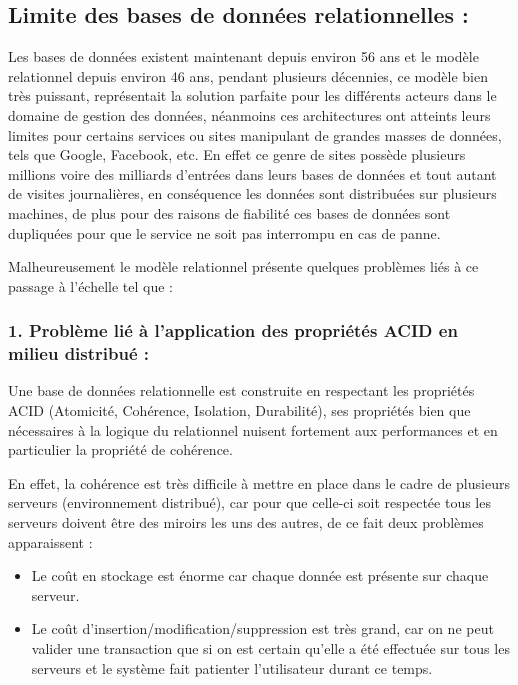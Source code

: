 \subsection{Limite des bases de données relationnelles :}
Les bases de données existent maintenant depuis environ 56 ans et le modèle relationnel depuis environ 46 ans, pendant plusieurs décennies, ce modèle bien très puissant, représentait la solution parfaite pour les différents acteurs dans le domaine de gestion des données, néanmoins ces architectures ont atteints leurs limites pour certains services ou sites manipulant de grandes masses de données, tels que Google, Facebook, etc. En effet ce genre de sites possède plusieurs millions voire des milliards d’entrées dans leurs bases de données et tout autant de visites journalières, en conséquence les données sont distribuées sur plusieurs machines, de plus pour des raisons de fiabilité ces bases de données sont dupliquées pour que le service ne soit pas interrompu en cas de panne.

Malheureusement le modèle relationnel présente quelques problèmes liés à ce passage à l’échelle tel que :

\subsubsection{1. Problème lié à l’application des propriétés ACID en milieu distribué :}
Une base de données relationnelle est construite en respectant les propriétés ACID (Atomicité, Cohérence, Isolation, Durabilité), ses propriétés bien que nécessaires à la logique du relationnel nuisent fortement aux performances et en particulier la propriété de cohérence.

En effet, la cohérence est très difficile à mettre en place dans le cadre de plusieurs serveurs (environnement distribué), car pour que celle-ci soit respectée tous les serveurs doivent être des miroirs les uns des autres, de ce fait deux problèmes apparaissent :
\begin{itemize}[label=\textbullet]
\item Le coût en stockage est énorme car chaque donnée est présente sur chaque serveur.
\item Le coût d’insertion/modification/suppression est très grand, car on ne peut valider une transaction que si on est certain qu’elle a été effectuée sur tous les serveurs et le système fait patienter l’utilisateur durant ce temps.
\end{itemize}

